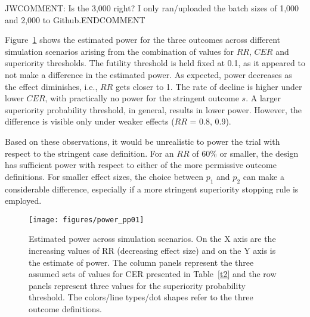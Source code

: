 \documentclass[12pt]{article}
\begin{document}
JWCOMMENT: Is the 3,000 right?  I only ran/uploaded the batch sizes of 1,000 and 2,000 to Github.ENDCOMMENT

Figure~\ref{fig:power} shows the estimated power for the three outcomes across different simulation scenarios arising from the combination of values for $RR$, $CER$ and superiority thresholds. The futility threshold is held fixed at 0.1, as it appeared to not make a difference in the estimated power. As expected, power decreases as the effect diminishes, i.e., $RR$ gets closer to 1. The rate of decline is higher under lower $CER$, with practically no power for the stringent outcome $s$. A larger superiority probability threshold, in general, results in lower power. However, the difference is visible only under weaker effects ($RR$ = 0.8, 0.9).

Based on these observations, it would be unrealistic to power the trial with respect to the stringent case definition. For an $RR$ of 60\% or smaller, the design has sufficient power with respect to either of the more permissive outcome definitions. For smaller effect sizes, the choice between $p_1$ and $p_2$ can make a considerable difference, especially if a more stringent superiority stopping rule is employed.

\begin{figure}[t]

		\centering
		\texttt{[image: figures/power\_pp01]}
		\caption{Estimated power across simulation scenarios. On the X axis are the increasing values of RR (decreasing effect size) and on the Y axis is the estimate of power. The column panels represent the three assumed sets of values for CER presented in Table~\ref{t2} and the row panels represent three values for the superiority probability threshold. The colors/line types/dot shapes refer to the three outcome definitions.}
		\label{fig:power}

\end{figure}
\end{document}
